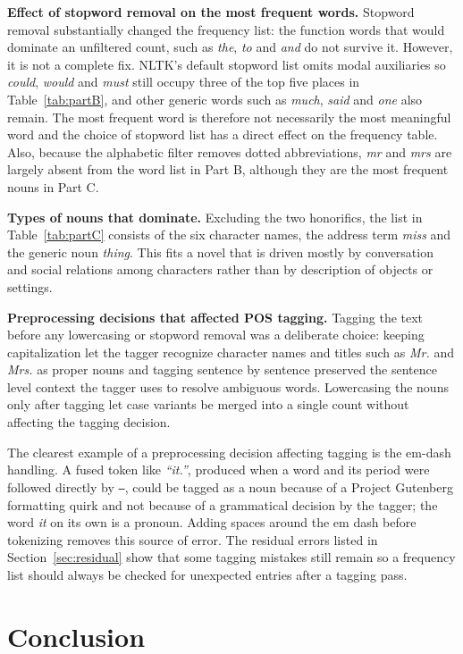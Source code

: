 \documentclass[sigconf]{acmart}
\begin{document}
\textbf{Effect of stopword removal on the most frequent words.} Stopword
removal substantially changed the frequency list: the function words that
would dominate an unfiltered count, such as \textit{the}, \textit{to} and
\textit{and} do not survive it. However, it is not a complete fix.
NLTK's default stopword list omits modal auxiliaries so \textit{could},
\textit{would} and \textit{must} still occupy three of the top five places
in Table~\ref{tab:partB}, and other generic words such as \textit{much},
\textit{said} and \textit{one} also remain. The most frequent word is
therefore not necessarily the most meaningful word and the choice of
stopword list has a direct effect on the frequency table. Also, because the
alphabetic filter removes dotted abbreviations, \textit{mr} and \textit{mrs}
are largely absent from the word list in Part B, although they are the most
frequent nouns in Part C.

\textbf{Types of nouns that dominate.} Excluding the two honorifics, the
list in Table~\ref{tab:partC} consists of the six character names, the
address term \textit{miss} and the generic noun \textit{thing}. This fits a
novel that is driven mostly by conversation and social relations among characters rather than by description of objects or
settings.

\textbf{Preprocessing decisions that affected POS tagging.} Tagging the
text before any lowercasing or stopword removal was a deliberate choice:
keeping capitalization let the tagger recognize character names and titles
such as \textit{Mr.} and \textit{Mrs.} as proper nouns and tagging
sentence by sentence preserved the sentence level context the tagger uses
to resolve ambiguous words. Lowercasing the nouns only after tagging let
case variants be merged into a single count without affecting the tagging
decision.

The clearest example of a preprocessing decision affecting tagging is the
em-dash handling. A fused token like \textit{``it.''}, produced when a
word and its period were followed directly by \texttt{--}, could be tagged
as a noun because of a Project Gutenberg formatting quirk and not because
of a grammatical decision by the tagger; the word \textit{it} on its own
is a pronoun. Adding spaces around the em dash before tokenizing removes
this source of error. The residual errors listed in Section~\ref{sec:residual} show that
some tagging mistakes still remain so a frequency list should always be
checked for unexpected entries after a tagging pass.

\section{Conclusion}
\end{document}
